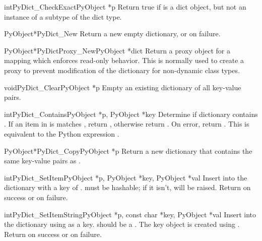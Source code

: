\begin{cfuncdesc}{int}{PyDict_CheckExact}{PyObject *p}
  Return true if  is a dict object, but not an instance of a
  subtype of the dict type.
\end{cfuncdesc}

\begin{cfuncdesc}{PyObject*}{PyDict_New}{}
  Return a new empty dictionary, or \NULL{} on failure.
\end{cfuncdesc}

\begin{cfuncdesc}{PyObject*}{PyDictProxy_New}{PyObject *dict}
  Return a proxy object for a mapping which enforces read-only
  behavior.  This is normally used to create a proxy to prevent
  modification of the dictionary for non-dynamic class types.
\end{cfuncdesc}

\begin{cfuncdesc}{void}{PyDict_Clear}{PyObject *p}
  Empty an existing dictionary of all key-value pairs.
\end{cfuncdesc}

\begin{cfuncdesc}{int}{PyDict_Contains}{PyObject *p, PyObject *key}
  Determine if dictionary  contains .  If an item
  in  is matches , return , otherwise return
  .  On error, return .  This is equivalent to the
  Python expression .
\end{cfuncdesc}

\begin{cfuncdesc}{PyObject*}{PyDict_Copy}{PyObject *p}
  Return a new dictionary that contains the same key-value pairs as
  .
\end{cfuncdesc}

\begin{cfuncdesc}{int}{PyDict_SetItem}{PyObject *p, PyObject *key,
                                       PyObject *val}
  Insert  into the dictionary  with a key of
  .   must be hashable; if it isn't,
   will be raised.
  Return  on success or  on failure.
\end{cfuncdesc}

\begin{cfuncdesc}{int}{PyDict_SetItemString}{PyObject *p,
            const char *key,
            PyObject *val}
  Insert  into the dictionary  using  as a
  key.  should be a .  The key object is created
  using . Return  on
  success or  on failure.
\end{cfuncdesc}

